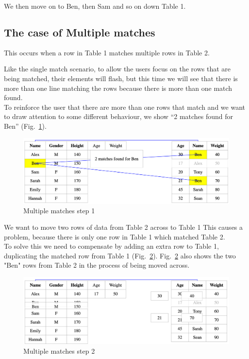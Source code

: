 We then move on to Ben, then Sam and so on down Table 1.

\subsection{The case of Multiple matches}
This occurs when a row in Table 1 matches multiple rows in Table 2.

Like the single match scenario, to allow the users focus on the rows that are being matched, their elements will flash, but this time we will see that there is more than one line matching the rows because there is more than one match found. \\

To reinforce the user that there are more than one rows that match and we want to draw attention to some different behaviour, we show “2 matches found for Ben” (Fig.~\ref{fig:multiple1}).

\begin{figure}[H]
    \includegraphics[scale = 0.25]{Masters-Thesis/img/multiple1.png}
    \caption{Multiple matches step 1}
    \label{fig:multiple1}
\end{figure}

We want to move two rows of data from Table 2 across to Table 1 This causes a problem, because there is only one row in Table 1 which matched Table 2.  \\

To solve this we need to compensate by adding an extra row to Table 1, duplicating the matched row from Table 1 (Fig.~\ref{fig:multiple2}). Fig.~\ref{fig:multiple2} also shows the two "Ben" rows from Table 2 in the process of being moved across.  

\begin{figure}[H]
    \includegraphics[scale = 0.25]{Masters-Thesis/img/multiple2.png}
    \caption{Multiple matches step 2}
    \label{fig:multiple2}
\end{figure}

